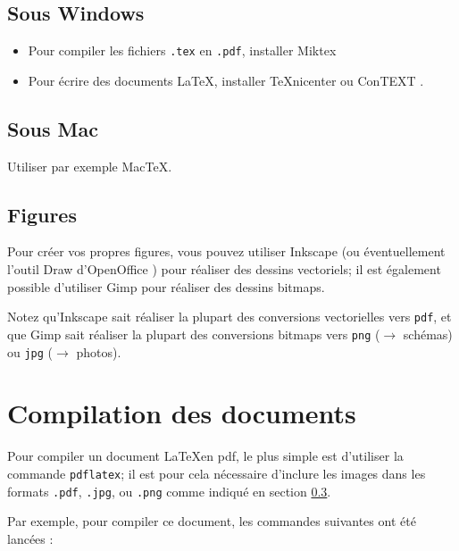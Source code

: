 \documentclass[12pt,oneside,noprintercorrection]{iut}
\begin{document}
\subsection{Sous Windows}

\begin{itemize}
\item Pour compiler les fichiers {\tt .tex} en {\tt .pdf}, installer  {\sc Miktex} \cite{Miktex}
\item Pour écrire des documents \LaTeX, installer  {\sc TeXnicenter} \cite{Texnicenter} ou  {\sc ConTEXT} \cite{ConTEXT}.
\end{itemize}

\subsection{Sous Mac}
Utiliser par exemple MacTeX. 

\subsection{Figures}
\label{subsection:figures}

Pour créer vos propres figures, vous pouvez utiliser {\sc Inkscape} \cite{Inkscape} (ou éventuellement l'outil {\sc Draw} d'OpenOffice \cite{OpenOffice}) pour réaliser des dessins vectoriels; il est également possible d'utiliser {\sc Gimp} \cite{Gimp} pour réaliser des dessins bitmaps.

Notez qu'{\sc Inkscape} sait réaliser la plupart des conversions vectorielles vers {\tt pdf}, et que {\sc Gimp} sait réaliser la plupart des conversions bitmaps vers {\tt png} ($\rightarrow$ schémas) ou {\tt jpg} ($\rightarrow$ photos).

\section{Compilation des documents}
Pour compiler un document \LaTeX  en pdf, le plus simple est d'utiliser la commande {\tt pdflatex}; 
il est pour cela nécessaire d'inclure les images dans les formats {\tt .pdf}, {\tt .jpg}, ou {\tt .png}
comme indiqué en section \ref{subsection:figures}.


Par exemple, pour compiler ce document, les commandes suivantes ont été lancées :
\begin{center}
\end{center}            
\end{document}
